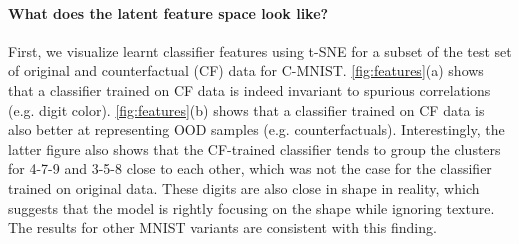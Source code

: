 \paragraph{What does the latent feature space look like?} First, we visualize learnt classifier features using t-SNE for a subset of the test set of original and counterfactual (CF) data for C-MNIST.  \cref{fig:features}(a) shows that a classifier trained on CF data is indeed invariant to spurious correlations (e.g. digit color). \cref{fig:features}(b) shows that a classifier trained on CF data is also better at representing OOD samples (e.g. counterfactuals).
Interestingly, the latter figure also shows that the CF-trained classifier tends to group the clusters for 4-7-9 and 3-5-8 close to each other, which was not the case for the classifier trained on original data. These digits are also close in shape in reality, which suggests that the model is rightly focusing on the shape while ignoring texture. The results for other MNIST variants are consistent with this finding.


